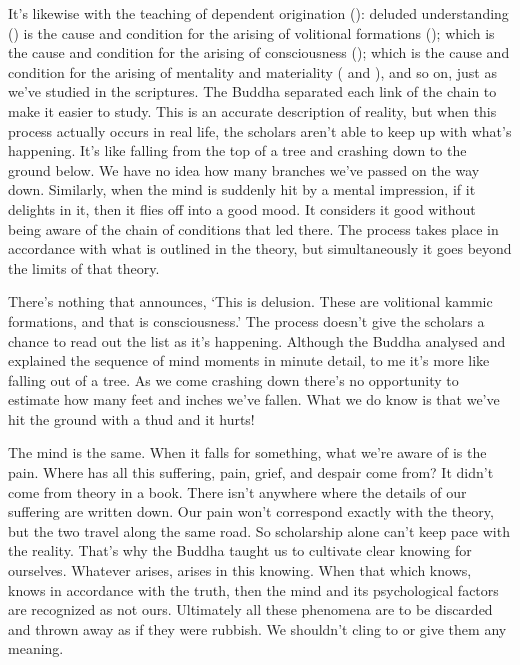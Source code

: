 It's likewise with the teaching of dependent origination (): deluded understanding () is the cause and condition for the arising of volitional  formations (); which is the cause and condition for the arising of consciousness (); which is the cause and condition for the arising of mentality and materiality ( and ), and so on, just as we've studied in the scriptures. The Buddha separated each link of the chain to make it easier to study. This is an accurate description of reality, but when this process actually occurs in real life, the scholars aren't able to keep up with what's happening. It's like falling from the top of a tree and crashing down to the ground below. We have no idea how many branches we've passed on the way down. Similarly, when the mind is suddenly hit by a mental impression, if it delights in it, then it flies off into a good mood. It considers it good without being aware of the chain of conditions that led there. The process takes place in accordance with what is outlined in the theory, but simultaneously it goes beyond the limits of that theory. 

There's nothing that announces, `This is delusion. These are volitional kammic formations, and that is consciousness.' The process doesn't give the scholars a chance to read out the list as it's happening. Although the Buddha analysed and explained the sequence of mind moments in minute detail, to me it's more like falling out of a tree. As we come crashing down there's no opportunity to estimate how many feet and inches we've fallen. What we do know is that we've hit the ground with a thud and it hurts! 

The mind is the same. When it falls for something, what we're aware of is the pain. Where has all this suffering, pain, grief, and despair come from? It didn't come from theory in a book. There isn't anywhere where the details of our suffering are written down. Our pain won't correspond exactly with the theory, but the two travel along the same road. So scholarship alone can't keep pace with the reality. That's why the Buddha taught us to cultivate clear knowing for ourselves. Whatever arises, arises in this knowing. When that which knows, knows in accordance with the truth, then the mind and its psychological factors are recognized as not ours. Ultimately all these phenomena are to be discarded and thrown away as if they were rubbish. We shouldn't cling to or give them any meaning. 

